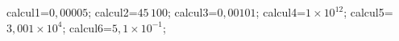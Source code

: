 \documentclass[exercice]{thedocument}%
\begin{document}
%
    \>calcul1=$0,00005$;%
    \>calcul2=$45\,100$;%
    \>calcul3=$0,00101$;%
    \>calcul4=$1\times10^{12}$;%
    \>calcul5=$3,001\times10^{4}$;%
    \>calcul6=$5,1\times10^{-1}$;%
\end{document}
